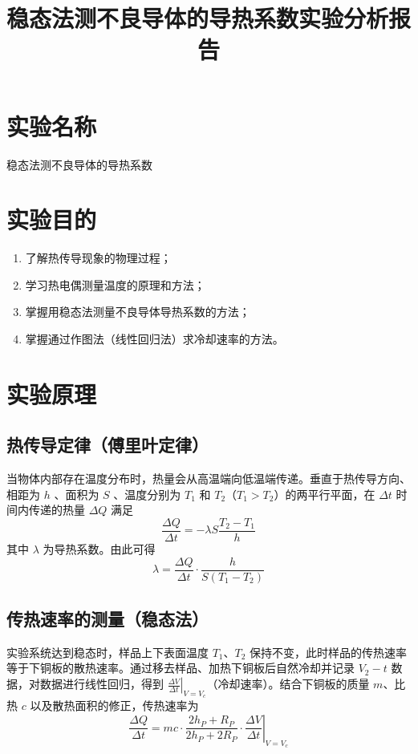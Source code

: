 \documentclass[12pt]{ctexart}
\title{稳态法测不良导体的导热系数实验分析报告}
\author{}
\date{}
\begin{document}
\maketitle

\section{实验名称}
稳态法测不良导体的导热系数

\section{实验目的}
\begin{enumerate}
\item 了解热传导现象的物理过程；
\item 学习热电偶测量温度的原理和方法；
\item 掌握用稳态法测量不良导体导热系数的方法；
\item 掌握通过作图法（线性回归法）求冷却速率的方法。
\end{enumerate}

\section{实验原理}
\subsection{热传导定律（傅里叶定律）}
当物体内部存在温度分布时，热量会从高温端向低温端传递。垂直于热传导方向、相距为 $h$ 、面积为 $S$ 、温度分别为 $T_1$ 和 $T_2$（$T_1>T_2$）的两平行平面，在 $\Delta t$ 时间内传递的热量 $\Delta Q$ 满足
\begin{equation}
\frac{\Delta Q}{\Delta t} = -\lambda S \frac{T_2-T_1}{h}
\end{equation}
其中 $\lambda$ 为导热系数。由此可得
\begin{equation}
\lambda = \frac{\Delta Q}{\Delta t} \cdot \frac{h}{S(T_1-T_2)}
\end{equation}

\subsection{传热速率的测量（稳态法）}
实验系统达到稳态时，样品上下表面温度 $T_1、T_2$ 保持不变，此时样品的传热速率等于下铜板的散热速率。通过移去样品、加热下铜板后自然冷却并记录 $V_2-t$ 数据，对数据进行线性回归，得到 $\left.\frac{\Delta V}{\Delta t}\right|_{V=V_c}$（冷却速率）。结合下铜板的质量 $m$、比热 $c$ 以及散热面积的修正，传热速率为
\begin{equation}
\frac{\Delta Q}{\Delta t} = mc \cdot \frac{2h_P+R_P}{2h_P+2R_P} \cdot \left. \frac{\Delta V}{\Delta t} \right|_{V=V_c}
\end{equation}
\end{document}
